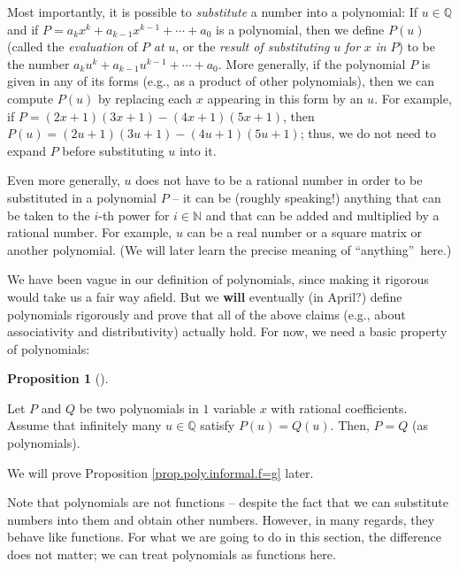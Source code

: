 \documentclass[numbers=enddot,12pt,final,onecolumn,notitlepage]{scrartcl}%
\numberwithin{exer}{subsection}
\theoremstyle{definition}
\newtheorem{prop}[theo]{Proposition}
\newenvironment{proposition}[1][]
{\begin{prop}[#1]\begin{leftbar}}
{\end{leftbar}\end{prop}}
\begin{document}
Most importantly, it is possible to \textit{substitute} a number into a
polynomial: If $u\in\mathbb{Q}$ and if $P=a_{k}x^{k}+a_{k-1}x^{k-1}%
+\cdots+a_{0}$ is a polynomial, then we define $P\left(  u\right)  $ (called
the \textit{evaluation} of $P$ \textit{at} $u$, or the \textit{result of
substituting }$u$ \textit{for }$x$ \textit{in} $P$) to be the number
$a_{k}u^{k}+a_{k-1}u^{k-1}+\cdots+a_{0}$. More generally, if the polynomial
$P$ is given in any of its forms (e.g., as a product of other polynomials),
then we can compute $P\left(  u\right)  $ by replacing each $x$ appearing in
this form by an $u$. For example, if $P=\left(  2x+1\right)  \left(
3x+1\right)  -\left(  4x+1\right)  \left(  5x+1\right)  $, then $P\left(
u\right)  =\left(  2u+1\right)  \left(  3u+1\right)  -\left(  4u+1\right)
\left(  5u+1\right)  $; thus, we do not need to expand $P$ before substituting
$u$ into it.

Even more generally, $u$ does not have to be a rational number in order to be
substituted in a polynomial $P$ -- it can be (roughly speaking!) anything that
can be taken to the $i$-th power for $i\in\mathbb{N}$ and that can be added
and multiplied by a rational number. For example, $u$ can be a real number or
a square matrix or another polynomial. (We will later learn the precise
meaning of \textquotedblleft anything\textquotedblright\ here.)

We have been vague in our definition of polynomials, since making it rigorous
would take us a fair way afield. But we \textbf{will} eventually (in April?)
define polynomials rigorously and prove that all of the above claims (e.g.,
about associativity and distributivity) actually hold. For now, we need a
basic property of polynomials:

\begin{proposition}
\label{prop.poly.informal.f=g}Let $P$ and $Q$ be two polynomials in $1$
variable $x$ with rational coefficients. Assume that infinitely many
$u\in\mathbb{Q}$ satisfy $P\left(  u\right)  =Q\left(  u\right)  $. Then,
$P=Q$ (as polynomials).
\end{proposition}

We will prove Proposition \ref{prop.poly.informal.f=g} later.

Note that polynomials are not functions -- despite the fact that we can
substitute numbers into them and obtain other numbers. However, in many
regards, they behave like functions. For what we are going to do in this
section, the difference does not matter; we can treat polynomials as functions here.
\end{document}
